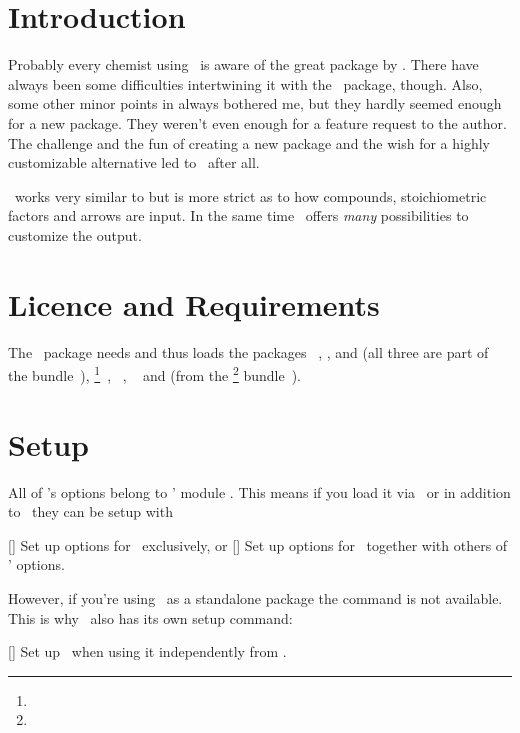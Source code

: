 \documentclass[load-preamble+]{cnltx-doc}
\begin{document}
\section{Introduction}
Probably every chemist using \LaTeXe\ is aware of the great 
package by \hensel.  There have always been some difficulties intertwining it
with the \chemmacros\ package, though.  Also, some other minor points in
 always bothered me, but they hardly seemed enough for a new
package.  They weren't even enough for a feature request to the 
author.  The challenge and the fun of creating a new package and the wish for
a highly customizable alternative led to \chemformula\ after all.

\chemformula\ works very similar to  but is more strict as to how
compounds, stoichiometric factors and arrows are input.  In the same time
\chemformula\ offers \emph{many} possibilities to customize the output.

\section{Licence and Requirements}
\license

The \chemformula\ package needs and thus loads the packages
~\cite{bnd:l3kernel}, ,  and
 (all three are part of the 
bundle~\cite{bnd:l3packages}),
\footnote{}~\cite{pkg:pgf},
~\cite{pkg:amstext}, ~\cite{pkg:nicefrac} and
 (from the \KOMAScript\footnote{}
bundle~\cite{bnd:koma-script}).

\section{Setup}
All of \chemformula's options belong to \chemmacros' module
.  This means if you load it via \chemmacros\ or in
addition to \chemmacros\ they can be setup with
\begin{commands}
  []
    Set up options for \chemformula\ exclusively, or
  []
    Set up options for \chemformula\ together with others of \chemmacros'
    options.
\end{commands}
However, if you're using \chemformula\ as a standalone package the command
 is not available.  This is why \chemformula\ also has its own
setup command:
\begin{commands}
  []
    Set up \chemformula\ when using it independently from \chemmacros.
\end{commands}
\end{document}

